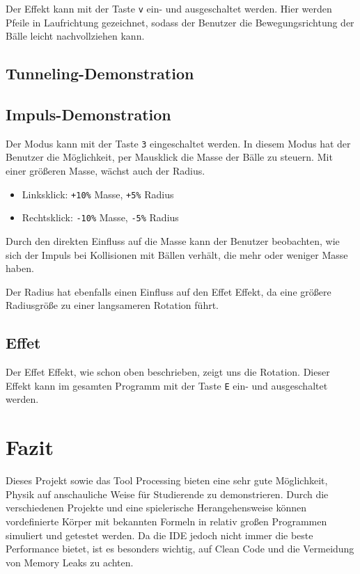 \documentclass[12pt,a4paper]{article}
\begin{document}
	Der Effekt kann mit der Taste \texttt{v} ein- und ausgeschaltet werden.  
	Hier werden Pfeile in Laufrichtung gezeichnet, sodass der Benutzer die Bewegungsrichtung der Bälle leicht nachvollziehen kann.  
		
	
	\subsection{Tunneling-Demonstration}
	
	
	\subsection{Impuls-Demonstration}
	
	Der Modus kann mit der Taste \texttt{3} eingeschaltet werden. 
	In diesem Modus hat der Benutzer die Möglichkeit, per Mausklick die Masse der Bälle zu steuern. 
	Mit einer größeren Masse, wächst auch der Radius. 
\begin{itemize}
	\item Linksklick: \texttt{+10\%} Masse, \texttt{+5\%} Radius  
	\item Rechtsklick: \texttt{-10\%} Masse, \texttt{-5\%} Radius  
\end{itemize}

Durch den direkten Einfluss auf die Masse kann der Benutzer beobachten, wie sich der Impuls bei Kollisionen mit Bällen verhält, die mehr oder weniger Masse haben.  

Der Radius hat ebenfalls einen Einfluss auf den Effet Effekt, da eine größere Radiusgröße zu einer langsameren Rotation führt.

	
	
	\subsection{Effet}
	
	Der Effet Effekt, wie schon oben beschrieben, zeigt uns die Rotation. Dieser Effekt kann im gesamten Programm mit der Taste \texttt{E} ein- und ausgeschaltet werden.
	
	\section{Fazit}
	
Dieses Projekt sowie das Tool Processing bieten eine sehr gute Möglichkeit, Physik auf anschauliche Weise für Studierende zu demonstrieren. Durch die verschiedenen Projekte und eine spielerische Herangehensweise können vordefinierte Körper mit bekannten Formeln in relativ großen Programmen simuliert und getestet werden. Da die IDE jedoch nicht immer die beste Performance bietet, ist es besonders wichtig, auf Clean Code und die Vermeidung von Memory Leaks zu achten.
	
\end{document}
